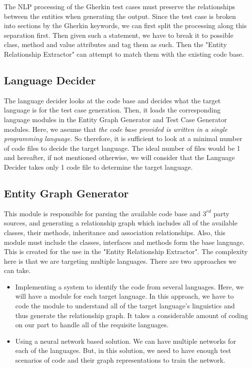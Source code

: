 \documentclass[conference, onecolumn, a4, 12pt]{IEEEtran}
\begin{document}
The NLP processing of the Gherkin test cases must preserve the relationships between the entities when generating the output. Since the test case is broken into sections by the Gherkin keywords, we can first split the processing along this separation first. Then given such a statement, we have to break it to possible class, method and value attributes and tag them as such. Then the "Entity Relationship Extractor" can attempt to match them  with the existing code base.

 \subsection{Language Decider}
The language decider looks at the code base and decides what the target language is for the test case generation. Then, it loads the corresponding language modules in the Entity Graph Generator and Test Case Generator modules. Here, we assume that \textit{the code base provided is written in a single programming language.} So therefore, it is sufficient to look at a minimal number of code files to decide the target language. The ideal number of files would be 1 and hereafter, if not mentioned otherwise, we will consider that the Language Decider takes only 1 code file to determine the target language.
 
\subsection{Entity Graph Generator}
This module is responsible for parsing the available code base and $3^{rd}$ party sources, and generating a relationship graph which includes all of the available classes, their methods, inheritance and association relationships. Also, this module must include the classes, interfaces and methods form the base language. This is created for the use in the "Entity Relationship Extractor". The complexity here is that we are targeting multiple languages. There are two approaches we can take.

\begin{itemize}
	\item Implementing a system to identify the code from several languages. Here, we will have a module for each target language. In this approach, we have to code the module to understand all of the target language's linguistics and thus generate the relationship graph. It takes a considerable amount of coding on our part to handle all of the requisite languages.
	\item Using a neural network based solution. We can have multiple networks for each of the languages. But, in this solution, we need to have enough test scenarios of code and their graph representations to train the network.
\end{itemize}
\end{document}
